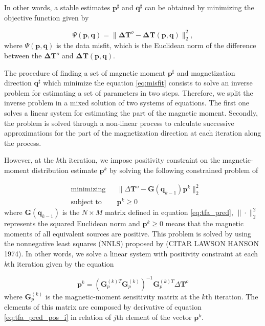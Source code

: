 In other words, a stable estimates $\mathbf{p}^\sharp$ and $\mathbf{q}^\sharp$ can be obtained by minimizing the objective function given by

\begin{equation}
\Psi(\mathbf{p}, \mathbf{q}) =  \parallel \mathbf{\Delta T}^o - \mathbf{\Delta T} (\mathbf{p}, \mathbf{q}) \parallel_{2}^{2},
\label{eq:misfit}
\end{equation}
where $\Psi(\mathbf{p}, \mathbf{q})$ is the data misfit, which is the Euclidean norm of the difference between the $\mathbf{\Delta T}^o$ and $\mathbf{\Delta T} (\mathbf{p}, \mathbf{q})$.


The procedure of finding a set of magnetic moment $\mathbf{p}^\sharp$ and magnetization direction $\mathbf{q}^\sharp$ which minimize the equation \ref{eq:misfit} consists to solve an inverse problem for estimating a set of parameters in two steps. Therefore, we split the inverse problem in a mixed solution of two systems of equations. The first one solves a linear system for estimating the part of the magnetic moment. Secondly, the problem is solved through a non-linear process to calculate successive approximations for the part of the magnetization direction at each iteration along the process. 

However, at the $k$th iteration, we impose positivity constraint on the magnetic-moment distribution estimate $\mathbf{p}^k$ by solving the following constrained problem of

\begin{equation}
	\begin{aligned}
		& \text{minimizing}
		& &\lVert \Delta \mathbf{T}^o - \mathbf{G}(\mathbf{q}_{k-1}) \mathbf{p}^k \rVert_{2}^{2} \\
		& \text{subject to}
		& & \mathbf{p}^k \geqslant 0
	\end{aligned}
	\label{eq:positivity}
\end{equation}
where $\mathbf{G}(\mathbf{q}_{k-1})$ is the $N \times M$ matrix defined in equation \ref{eq:tfa_pred},
$\| \cdot \|_{2}^{2}$ represents the squared Euclidean norm and $\mathbf{p}^k \geqslant 0$ means that the magnetic moments of all equivalent sources are positive. This problem is solved by using the nonnegative least squares (NNLS) proposed by (CITAR LAWSON HANSON 1974). In other words, we solve a linear system with positivity constraint at each $k$th iteration given by the equation 

\begin{equation}
	\mathbf{p}^k = \left(\mathbf{G}_{p}^{(k)T} \mathbf{G}_{p}^{(k)}\right)^{-1} \mathbf{G}_{p}^{(k)T}  \Delta \mathbf{T}^o
	\label{eq:linsys_p}
\end{equation}
where $\mathbf{G}_p^{(k)}$ is the magnetic-moment sensitivity matrix at the $k$th iteration. The elements of this matrix are composed by derivative of equation \ref{eq:tfa_pred_pos_i} in relation of $j$th element of the vector $\mathbf{p}^k$.

